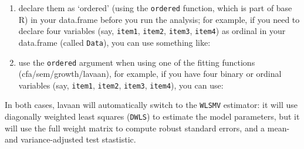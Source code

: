 \begin{enumerate}
\def\labelenumi{\arabic{enumi}.}
\item
  declare them as `ordered' (using the \texttt{ordered} function, which
  is part of base R) in your data.frame before you run the analysis; for
  example, if you need to declare four variables (say, \texttt{item1},
  \texttt{item2}, \texttt{item3}, \texttt{item4}) as ordinal in your
  data.frame (called \texttt{Data}), you can use something like:

\begin{Shaded}
\begin{Highlighting}[]
\NormalTok{Data[,}\NormalTok{(}\NormalTok{,}
        \NormalTok{,}
        \NormalTok{,}
        \NormalTok{)] <-}
\StringTok{    }\NormalTok{(Data[,}\NormalTok{(}\NormalTok{,}
                   \NormalTok{,}
                   \NormalTok{,}
                   \NormalTok{)], ordered)}
\end{Highlighting}
\end{Shaded}
\item
  use the \texttt{ordered} argument when using one of the fitting
  functions (cfa/sem/growth/lavaan), for example, if you have four
  binary or ordinal variables (say, \texttt{item1}, \texttt{item2},
  \texttt{item3}, \texttt{item4}), you can use:

\begin{Shaded}
\begin{Highlighting}[]
\StringTok{ } 
           \NormalTok{(}\NormalTok{,}\NormalTok{,}
                     \NormalTok{,}\NormalTok{))}
\end{Highlighting}
\end{Shaded}
\end{enumerate}

In both cases, lavaan will automatically switch to the \texttt{WLSMV}
estimator: it will use diagonally weighted least squares (\texttt{DWLS})
to estimate the model parameters, but it will use the full weight matrix
to compute robust standard errors, and a mean- and variance-adjusted
test stastistic.
